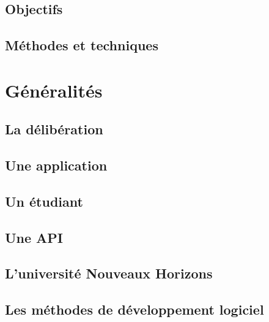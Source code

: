 \documentclass[12pt, a4paper]{report}
\begin{document}
    \section{Objectifs}\label{sec:objectifs}
    

    \section{Méthodes et techniques}\label{sec:methode}
    

    \chapter{Généralités}\label{cha:generalites}

    \section{La délibération}\label{subsec:deliberation}
    

    \section{Une application}\label{subsec:application}
    

    \section{Un étudiant}\label{subsec:etudiants}
    

    \section{Une API}\label{subsec:api}
    

    \section{L'université Nouveaux Horizons}\label{subsec:unh}
    

    \section{Les méthodes de développement logiciel}\label{subsec:methode-de-developpement-logiciel}
    
\end{document}
